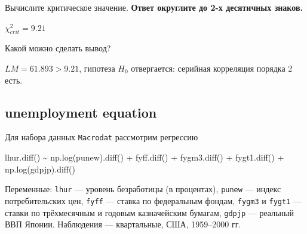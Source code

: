 \documentclass[
  russian,
]{article}
\newenvironment{Shaded}{\begin{snugshade}}{\end{snugshade}}
\newcommand{\NormalTok}[1]{\textcolor[rgb]{0.00,0.23,0.31}{#1}}
\newcommand{\OperatorTok}[1]{\textcolor[rgb]{0.37,0.37,0.37}{#1}}
\begin{document}
Вычислите критическое значение. \textbf{Ответ округлите до 2-х
десятичных знаков.}

\begin{tcolorbox}[enhanced jigsaw, arc=.35mm, bottomrule=.15mm, bottomtitle=1mm, breakable, colback=white, colbacktitle=quarto-callout-note-color!10!white, colframe=quarto-callout-note-color-frame, coltitle=black, left=2mm, leftrule=.75mm, opacityback=0, opacitybacktitle=0.6, rightrule=.15mm, title=\textcolor{quarto-callout-note-color}{\faInfo}\hspace{0.5em}{Критическое значение}, titlerule=0mm, toprule=.15mm, toptitle=1mm]

\(\chi^2_{crit} = 9.21\)

\end{tcolorbox}

Какой можно сделать вывод?

\begin{tcolorbox}[enhanced jigsaw, arc=.35mm, bottomrule=.15mm, bottomtitle=1mm, breakable, colback=white, colbacktitle=quarto-callout-tip-color!10!white, colframe=quarto-callout-tip-color-frame, coltitle=black, left=2mm, leftrule=.75mm, opacityback=0, opacitybacktitle=0.6, rightrule=.15mm, title=\textcolor{quarto-callout-tip-color}{\faLightbulb}\hspace{0.5em}{Вывод (BG-тест)}, titlerule=0mm, toprule=.15mm, toptitle=1mm]

\(LM = 61.893 > 9.21\), гипотеза \(H_0\) отвергается: серийная
корреляция порядка 2 есть.

\end{tcolorbox}

\subsection{unemployment equation}\label{unemployment-equation}

Для набора данных \texttt{Macrodat} рассмотрим регрессию

\begin{Shaded}
\begin{Highlighting}[]
\NormalTok{lhur.diff() }\OperatorTok{\textasciitilde{}}\NormalTok{ np.log(punew).diff() }\OperatorTok{+}\NormalTok{ fyff.diff() }\OperatorTok{+}\NormalTok{ fygm3.diff() }\OperatorTok{+}
\NormalTok{              fygt1.diff() }\OperatorTok{+}\NormalTok{ np.log(gdpjp).diff()}
\end{Highlighting}
\end{Shaded}

Переменные: \texttt{lhur} --- уровень безработицы (в процентах),
\texttt{punew} --- индекс потребительских цен, \texttt{fyff} --- ставка
по федеральным фондам, \texttt{fygm3} и \texttt{fygt1} --- ставки по
трёхмесячным и годовым казначейским бумагам, \texttt{gdpjp} --- реальный
ВВП Японии. Наблюдения --- квартальные, США, 1959--2000 гг.
\end{document}
